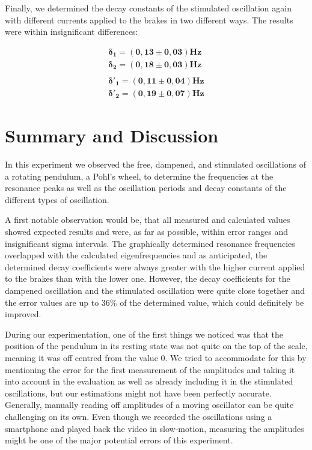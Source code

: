 \documentclass{article}
\begin{document}
Finally, we determined the decay constants of the stimulated oscillation again with different currents applied to the brakes in two different ways. The results were within insignificant differences:

\begin{equation}
    \begin{split}
        \bm{\delta_1} = \bm{(0,13 \pm 0,03)} \textbf{Hz} \\
        \bm{\delta_2} = \bm{(0,18 \pm 0,03)} \textbf{Hz} \\ \\ 
        \bm{\delta'_1} = \bm{(0,11 \pm 0,04)} \textbf{Hz} \\
        \bm{\delta'_2} = \bm{(0,19 \pm 0,07)} \textbf{Hz}        
    \end{split}
\end{equation}

\newpage
\section{Summary and Discussion}

In this experiment we observed the free, dampened, and stimulated oscillations of a rotating pendulum, a Pohl's wheel, to determine the frequencies at the resonance peaks as well as the oscillation periods and decay constants of the different types of oscillation.

A first notable observation would be, that all measured and calculated values showed expected results and were, as far as possible, within error ranges and insignificant sigma intervals. The graphically determined resonance frequencies overlapped with the calculated eigenfrequencies and as anticipated, the determined decay coefficients were always greater with the higher current applied to the brakes than with the lower one. However, the decay coefficients for the dampened oscillation and the stimulated oscillation were quite close together and the error values are up to 36\% of the determined value, which could definitely be improved.

During our experimentation, one of the first things we noticed was that the position of the pendulum in its resting state was not quite on the top of the scale, meaning it was off centred from the value 0. We tried to accommodate for this by mentioning the error for the first measurement of the amplitudes and taking it into account in the evaluation as well as already including it in the stimulated oscillations, but our estimations might not have been perfectly accurate. Generally, manually reading off amplitudes of a moving oscillator can be quite challenging on its own. Even though we recorded the oscillations using a smartphone and played back the video in slow-motion, measuring the amplitudes might be one of the major potential errors of this experiment.
\end{document}
